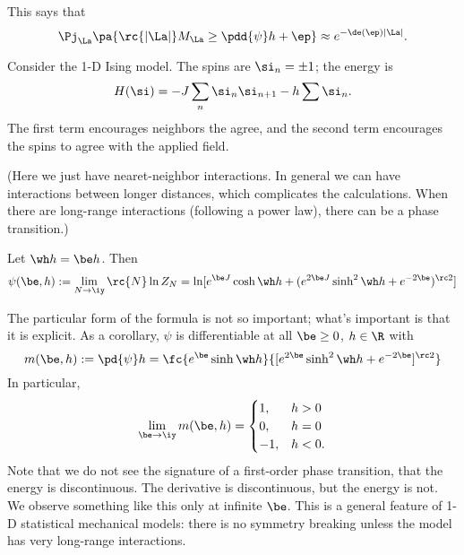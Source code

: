 This says that
\[
\Pj_{\La} \pa{\rc{|\La|}M_{\La} \ge \pdd{\psi}h + \ep} \approx e^{-\de(\ep)|\La|}.
\]


Consider the 1-D Ising model. The spins are $\si_n=\pm 1$; the energy is
\[
H(\si) = -J\sum_{n} \si_n\si_{n+1} - h\sum \si_n.
\]
The first term encourages neighbors the agree, and the second term encourages the spins to agree with the applied field.

(Here we just have nearet-neighbor interactions. In general we can have interactions between longer distances, which complicates the calculations. When there are long-range interactions (following a power law), there can be a phase transition.)
\begin{thm}
Let $\wh h = \be h$. Then
\[
\psi(\be, h):= \lim_{N\to \iy} \rc{N} \ln Z_N = \ln [e^{\be J} \cosh \wh h + (e^{2\be J} \sinh^2 \wh h + e^{-2\be})^{\rc 2}]
\]
\end{thm}
The particular form of the formula is not so important; what's important is that it is explicit. As a corollary, $\psi$ is differentiable at all $\be \ge 0$, $h\in \R$ with 
\[
m(\be, h):=\pd{\psi}h =  \fc{e^{\be}\sinh \wh h}{[e^{2\be }\sinh^2 \wh h + e^{-2\be}]^{\rc 2}}
\]
In particular, 
\[
\lim_{\be\to \iy} m(\be, h) = \begin{cases}
1,&h>0\\
0,&h=0\\
-1,&h<0.
\end{cases}
\]
Note that we do not see the signature of a first-order phase transition, that the energy is discontinuous. The derivative is discontinuous, but the energy is not. We observe something like this only at infinite $\be$. This is a general feature of 1-D statistical mechanical models: there is no symmetry breaking unless the model has very long-range interactions.

